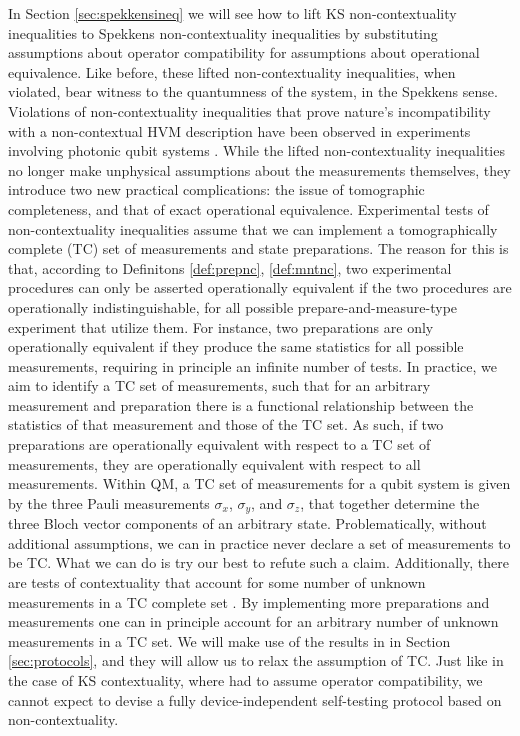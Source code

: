 In Section \ref{sec:spekkensineq} we will see how to lift KS non-contextuality inequalities to Spekkens non-contextuality inequalities by substituting assumptions about operator compatibility for assumptions about operational equivalence. Like before, these lifted non-contextuality inequalities, when violated, bear witness to the quantumness of the system, in the Spekkens sense. Violations of non-contextuality inequalities that prove nature's incompatibility with a non-contextual HVM description have been observed in experiments involving photonic qubit systems \cite{Mazurek2016}. While the lifted non-contextuality inequalities no longer make unphysical assumptions about the measurements themselves, they introduce two new practical complications: the issue of tomographic completeness, and that of exact operational equivalence. Experimental tests of non-contextuality inequalities assume that we can implement a tomographically complete (TC) set of measurements and state preparations. The reason for this is that, according to Definitons \ref{def:prepnc}, \ref{def:mntnc}, two experimental procedures can only be asserted operationally equivalent if the two procedures are operationally indistinguishable, for all possible prepare-and-measure-type experiment that utilize them. For instance, two preparations are only operationally equivalent if they produce the same statistics for all possible measurements, requiring in principle an infinite number of tests. In practice, we aim to identify a TC set of measurements, such that for an arbitrary measurement and preparation there is a functional relationship between the statistics of that measurement and those of the TC set. As such, if two preparations are operationally equivalent with respect to a TC set of measurements, they are operationally equivalent with respect to all measurements. Within QM, a TC set of measurements for a qubit system is given by the three Pauli measurements $\sigma_x$, $\sigma_y$, and $\sigma_z$, that together determine the three Bloch vector components of an arbitrary state. Problematically, without additional assumptions, we can in practice never declare a set of measurements to be TC. What we can do is try our best to refute such a claim. Additionally, there are tests of contextuality that account for some number of unknown measurements in a TC complete set \cite{Pusey2019a}. By implementing more preparations and measurements one can in principle account for an arbitrary number of unknown measurements in a TC set. We will make use of the results in \cite{Pusey2019a} in Section \ref{sec:protocols}, and they will allow us to relax the assumption of TC. Just like in the case of KS contextuality, where had to assume operator compatibility, we cannot expect to devise a fully device-independent self-testing protocol based on non-contextuality. 

